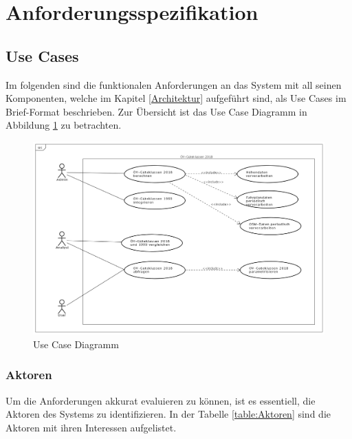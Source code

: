 
\section{Anforderungsspezifikation}
\label{Anforderungsspezifikation}

\subsection{Use Cases}
\label{Anforderungsspezifikation:Use Cases}

Im folgenden sind die funktionalen Anforderungen an das System mit all seinen Komponenten, welche im Kapitel \ref{Architektur} aufgeführt sind, als Use Cases im Brief-Format beschrieben.
Zur Übersicht ist das Use Case Diagramm in Abbildung \ref{fig:UseCase_OeV-Gueteklassen_2018} zu betrachten.

\begin{figure}[ht]
\centering
\includegraphics[width=1.0\linewidth]{projectdoc/img/UseCase_OeV-Gueteklassen_2018}
\caption[Use Case Diagramm]{Use Case Diagramm}
\label{fig:UseCase_OeV-Gueteklassen_2018}
\end{figure}

\subsubsection{Aktoren}
\label{Use Cases:Aktoren}

Um die Anforderungen akkurat evaluieren zu können, ist es essentiell, die Aktoren des Systems zu identifizieren.
In der Tabelle \ref{table:Aktoren} sind die Aktoren mit ihren Interessen aufgelistet.

